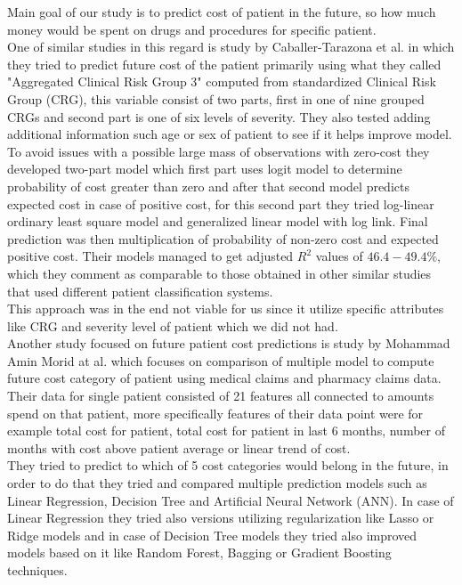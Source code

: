 
Main goal of our study is to predict cost of patient in the future, so how much money would be spent on drugs and procedures for specific patient.
\\
 
One of similar studies in this regard is study by Caballer-Tarazona et al. \cite{caballer2019predicting} in which they tried to predict future cost of the patient primarily using what they called "Aggregated Clinical Risk Group 3" computed from standardized Clinical Risk Group (CRG), this variable consist of two parts, first in one of nine grouped CRGs and second part is one of six levels of severity. They also tested adding additional information such age or sex of patient to see if it helps improve model. To avoid issues with a possible large mass of observations with zero-cost they developed two-part model which first part uses logit model to determine probability of cost greater than zero and after that second model predicts expected cost in case of positive cost, for this second part they tried log-linear ordinary least square model and generalized linear model with log link. Final prediction was then multiplication of probability of non-zero cost and expected positive cost. Their models managed to get adjusted $R^2$ values of $46.4-49.4\%$, which they comment as comparable to those obtained in other similar studies that used different patient classification systems. 
\\

This approach was in the end not viable for us since it utilize specific attributes like CRG and severity level of patient which we did not had.
\\

Another study focused on future patient cost predictions is study by Mohammad Amin Morid at al. \cite{morid2018supervised} which focuses on comparison of multiple model to compute future cost category of patient using medical claims and pharmacy claims data. 
\\

Their data for single patient consisted of 21 features all connected to amounts spend on that patient, more specifically features of their data point were for example total cost for patient, total cost for patient in last 6 months, number of months with cost above patient average or linear trend of cost.
\\

They tried to predict to which of 5 cost categories would belong in the future, in order to do that they tried and compared multiple prediction models such as Linear Regression, Decision Tree and Artificial Neural Network (ANN). In case of Linear Regression they tried also versions utilizing regularization like Lasso or Ridge models and in case of Decision Tree models they tried also improved models based on it like Random Forest, Bagging or Gradient Boosting techniques.
\\

